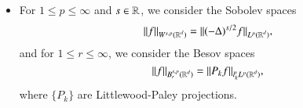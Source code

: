 \begin{itemize}
    \item For $1 \leq p \leq \infty$ and $s \in \operatorname{\mathbb{R}}$, we consider the Sobolev spaces
    \[ \| f \|_{W^{s,p}(\operatorname{\mathbb{R}}^d)} = \| (-\Delta)^{s/2} f \|_{L^p(\operatorname{\mathbb{R}}^d)}, \]
    and for $1 \leq r \leq \infty$, we consider the Besov spaces
    \[ \| f \|_{B^{s,p}_r(\operatorname{\mathbb{R}}^d)} = \| P_k f \|_{l^r_k L^p(\operatorname{\mathbb{R}}^d)}, \]
    where $\{ P_k \}$ are Littlewood-Paley projections.
\end{itemize}